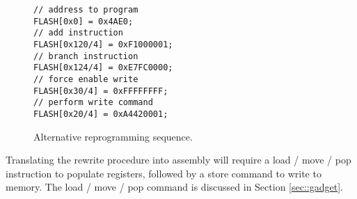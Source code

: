 	\begin{figure}[htbp]
		\begin{lstlisting}
// address to program
FLASH[0x0] = 0x4AE0; 
// add instruction
FLASH[0x120/4] = 0xF1000001;
// branch instruction
FLASH[0x124/4] = 0xE7FC0000;
// force enable write 
FLASH[0x30/4] = 0xFFFFFFFF;
// perform write command
FLASH[0x20/4] = 0xA4420001; 
		\end{lstlisting}
		\caption{Alternative reprogramming sequence.  }\label{fig::alt_prog}
	\end{figure}

Translating the rewrite procedure into assembly will require a load / move / pop instruction to populate registers, followed by a store command to write to memory. The load / move / pop command is discussed in Section \ref{sec::gadget}. 


